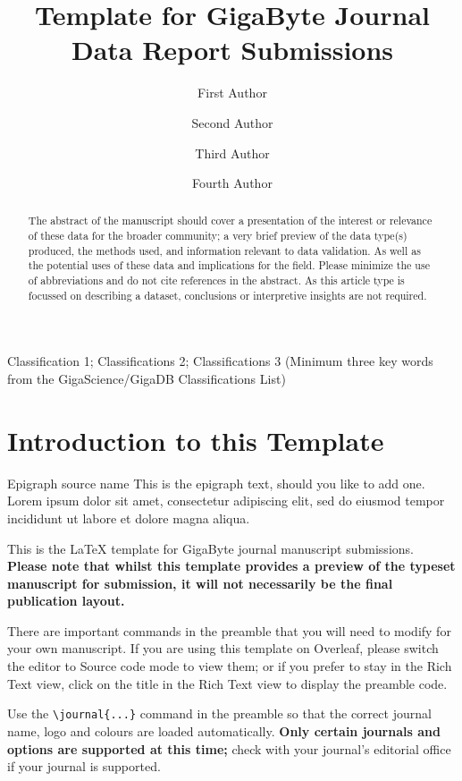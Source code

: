 \documentclass[a4paper,num-refs,gigabyte]{oup-contemporary}
\title{Template for GigaByte Journal Data Report Submissions}
\author[1,\authfn{1},\authfn{2}]{First Author}
\author[2,\authfn{1},\authfn{2}]{Second Author}
\author[2]{Third Author}
\author[2,\authfn{1}]{Fourth Author}
\affil[1]{First Institution}
\affil[2]{Second Institution}
\begin{document}
\begin{frontmatter}
\maketitle
\begin{abstract}
The abstract of the manuscript should cover a presentation of the interest or relevance of these data for the broader community; 
a very brief preview of the data type(s) produced, the methods used, and information relevant to data validation. 
As well as the potential uses of these data and implications for the field. Please minimize the use of abbreviations and 
do not cite references in the abstract. As this article type is focussed on describing a dataset, conclusions or interpretive 
insights are not required.
\end{abstract}

\begin{classifications}
Classification 1; Classifications 2; Classifications 3 (Minimum three key words from the GigaScience/GigaDB Classifications List)
\end{classifications}
\end{frontmatter}

\section{Introduction to this Template}

\begin{epigraph}{Epigraph source name}
This is the epigraph text, should you like to add one. Lorem ipsum dolor sit amet, consectetur adipiscing elit, sed do eiusmod tempor incididunt ut labore et dolore magna aliqua. 
\end{epigraph}

This is the \LaTeX{} template for GigaByte journal manuscript submissions. \textbf{Please note that whilst this template provides a preview of the typeset manuscript for submission, it will not necessarily be the final publication layout.}

There are important commands in the preamble that you will need to modify for your own manuscript. If you are using this template on Overleaf, please switch the editor to Source code mode to view them; or if you prefer to stay in the Rich Text view, click on the title in the Rich Text view to display the preamble code.

Use the \verb|\journal{...}| command in the preamble so that the correct journal name, logo and colours are loaded automatically. \textbf{Only certain journals and options are supported at this time;} check with your journal's editorial office if your journal is supported.
\end{document}
